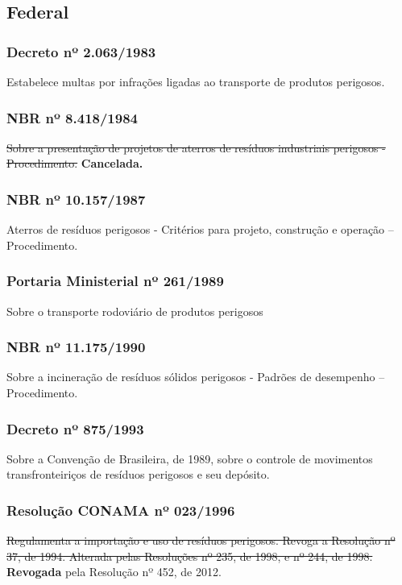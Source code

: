 \begin{subapend}
	\subsection{Federal}
	\begin{subsubapend}
		\item \subsubsection{Decreto nº 2.063/1983}
		Estabelece multas por infrações ligadas ao transporte de produtos perigosos.

		\subsubsection{NBR nº 8.418/1984}
		\sout{Sobre a presentação de projetos de aterros de resíduos industriais perigosos - Procedimento.} \textbf{Cancelada.}

		\subsubsection{NBR nº 10.157/1987}
		Aterros de resíduos perigosos - Critérios para projeto, construção e operação – Procedimento.
		
		\subsubsection{Portaria Ministerial nº 261/1989}
		Sobre o transporte rodoviário de produtos perigosos
		
		\subsubsection{NBR nº 11.175/1990}
		Sobre a incineração de resíduos sólidos perigosos - Padrões de desempenho – Procedimento.
		
		\subsubsection{Decreto nº 875/1993}
		Sobre a Convenção de Brasileira, de 1989, sobre o controle de movimentos transfronteiriços de resíduos perigosos e seu depósito.

		\subsubsection{Resolução CONAMA nº 023/1996}
		\sout{Regulamenta a importação e uso de resíduos perigosos. Revoga a Resolução nº 37, de 1994. Alterada pelas Resoluções nº 235, de 1998, e nº 244, de 1998.} \textbf{Revogada} pela Resolução nº 452, de 2012.
		

\end{subsubapend}
\end{subapend}
